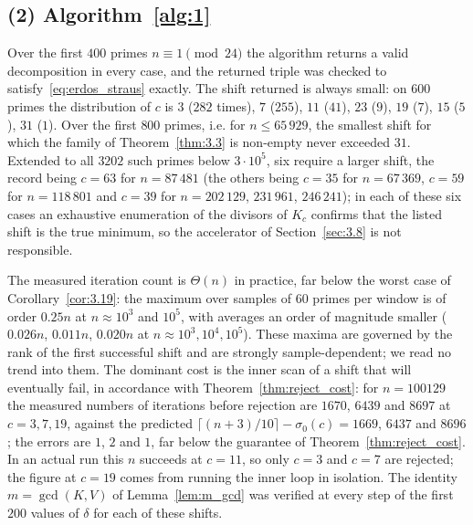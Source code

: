 \documentclass[11pt, a4paper]{article}
\theoremstyle{plain}
\theoremstyle{definition}
\begin{document}
\subsection*{(2) Algorithm~\ref{alg:1}}
Over the first $400$ primes $n\equiv1\pmod{24}$ the algorithm returns a valid decomposition in every case, and the returned triple was checked to satisfy~\eqref{eq:erdos_straus} exactly. The shift returned is always small: on $600$ primes the distribution of $c$ is $3$ ($282$ times), $7$ ($255$), $11$ ($41$), $23$ ($9$), $19$ ($7$), $15$ ($5$), $31$ ($1$). Over the first $800$ primes, i.e. for $n\le65\,929$, the smallest shift for which the family of Theorem~\ref{thm:3.3} is non-empty never exceeded $31$. Extended to all $3202$ such primes below $3\cdot10^{5}$, six require a larger shift, the record being $c=63$ for $n=87\,481$ (the others being $c=35$ for $n=67\,369$, $c=59$ for $n=118\,801$ and $c=39$ for $n=202\,129$, $231\,961$, $246\,241$); in each of these six cases an exhaustive enumeration of the divisors of $K_c$ confirms that the listed shift is the true minimum, so the accelerator of Section~\ref{sec:3.8} is not responsible.

The measured iteration count is $\Theta(n)$ in practice, far below the worst case of Corollary~\ref{cor:3.19}: the maximum over samples of $60$ primes per window is of order $0.25n$ at $n\approx10^{3}$ and $10^{5}$, with averages an order of magnitude smaller ($0.026n$, $0.011n$, $0.020n$ at $n\approx10^{3},10^{4},10^{5}$). These maxima are governed by the rank of the first successful shift and are strongly sample-dependent; we read no trend into them. The dominant cost is the inner scan of a shift that will eventually fail, in accordance with Theorem~\ref{thm:reject_cost}: for $n=100129$ the measured numbers of iterations before rejection are $1670$, $6439$ and $8697$ at $c=3,7,19$, against the predicted $\lceil (n+3)/10\rceil-\sigma_0(c)=1669$, $6437$ and $8696$; the errors are $1$, $2$ and $1$, far below the guarantee of Theorem~\ref{thm:reject_cost}. In an actual run this $n$ succeeds at $c=11$, so only $c=3$ and $c=7$ are rejected; the figure at $c=19$ comes from running the inner loop in isolation. The identity $m=\gcd(K,V)$ of Lemma~\ref{lem:m_gcd} was verified at every step of the first $200$ values of $\delta$ for each of these shifts.
\end{document}
